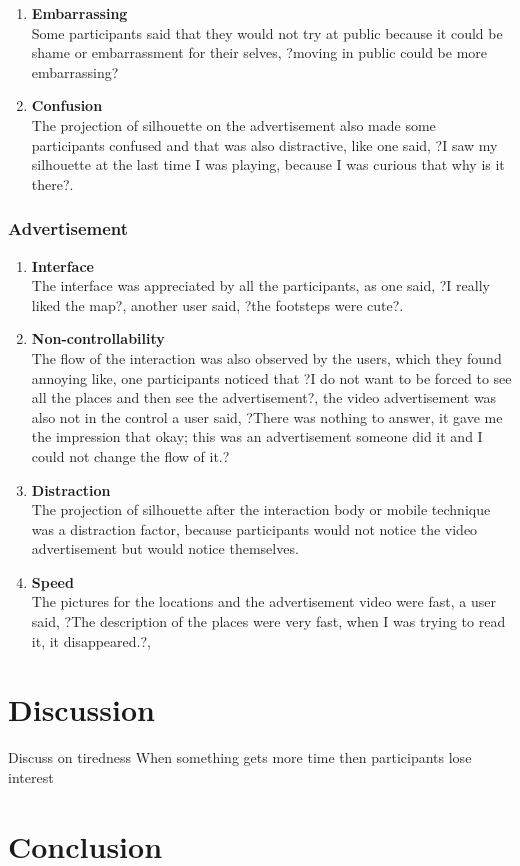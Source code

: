 \begin{enumerate}
\item	\textbf{Embarrassing}\\
Some participants said that they would not try at public because it could be shame or embarrassment for their selves, ?moving in public could be more embarrassing?

\item	\textbf{Confusion}\\
The projection of silhouette on the advertisement also made some participants confused and that was also distractive, like one said, ?I saw my silhouette at the last time I was playing, because I was curious that why is it there?. 

\end{enumerate}


\subsubsection{Advertisement}
\begin{enumerate}
\item	\textbf{Interface}\\
The interface was appreciated by all the participants, as one said, ?I really liked the map?, another user said, ?the footsteps were cute?.

\item	\textbf{Non-controllability}\\
The flow of the interaction was also observed by the users, which they found annoying like, one participants noticed that ?I do not want to be forced to see all the places and then see the advertisement?, the video advertisement was also not in the control a user said, ?There was nothing to answer, it gave me the impression that okay; this was an advertisement someone did it and I could not change the flow of it.? 

\item	\textbf{Distraction}\\
The projection of silhouette after the interaction body or mobile technique was a distraction factor, because participants would not notice the video advertisement but would notice themselves. 

\item	\textbf{Speed}\\
The pictures for the locations and the advertisement video were fast, a user said, ?The description of the places were very fast, when I was trying to read it, it disappeared.?, 

\end{enumerate}
\section{Discussion}

Discuss on tiredness
When something gets more time then participants lose interest

\section{Conclusion}












